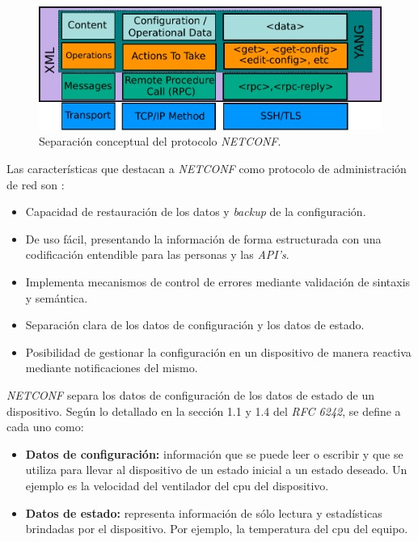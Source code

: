 \begin{figure}[htbp]
	\centering
	\includegraphics[scale=0.7]{Figures/stack-netconf.pdf}
	\caption{Separación conceptual del protocolo \textit{NETCONF}.}
	\label{fig:netconf}
  \end{figure}


  Las características que destacan a \textit{NETCONF} como protocolo de administración de red son \parencite{netconfpros}:

  \begin{itemize}
	\item Capacidad de restauración de los datos y \textit{backup} de la configuración.
	\item De uso fácil, presentando la información de forma estructurada con una codificación entendible para las personas y las \textit{API’s}.
	\item Implementa mecanismos de control de errores mediante validación de sintaxis y semántica.
	\item Separación clara de los datos de configuración y los datos de estado.
	\item Posibilidad de gestionar la configuración en un dispositivo de manera reactiva mediante notificaciones del mismo.
\end{itemize}

\textit{NETCONF} separa los datos de configuración de los datos de estado de un dispositivo. Según lo detallado en la sección 1.1 y 1.4 del \textit{RFC 6242}, se define a cada uno como:

\begin{itemize}
	\item \textbf{Datos de configuración:} información que se puede leer o escribir y que se utiliza para llevar al dispositivo de un estado inicial a un estado deseado. Un ejemplo es la velocidad del ventilador del cpu del dispositivo.  
	\item \textbf{Datos de estado:} representa información de sólo lectura y estadísticas brindadas por el dispositivo. Por ejemplo, la temperatura del cpu del equipo.   
\end{itemize}

